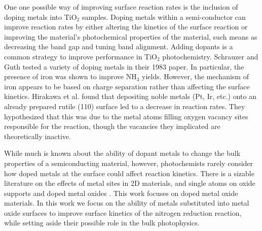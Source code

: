 One one possible way of improving surface reaction rates is the inclusion of doping metals into TiO$_2$ samples. Doping metals within a semi-conductor can improve reaction rates by either altering the kinetics of the surface reaction or improving the material's photochemical properties of the material, such means as decreasing the band gap and tuning band alignment. Adding dopants is a common strategy to improve performance in TiO$_2$ photochemistry.\cite{Schneider_2014, Li_2007, Dozzi_2013} Schrauzer and Guth tested a variety of doping metals in their 1983 paper.\cite{Schrauzer_1983} In particular, the presence of iron was shown to improve NH$_3$ yields\cite{Schrauzer_1977,Augugliaro_1982}. However, the mechanism of iron appears to be based on charge separation rather than affecting the surface kinetics.\cite{Comer_2018} Hirakawa et al. found that depositing noble metals (Pt, Ir, etc.) onto an already prepared rutile (110) surface led to a decrease in reaction rates.\cite{Hirakawa_2017} They hypothesized that this was due to the metal atoms filling oxygen vacancy sites responsible for the reaction, though the vacancies they implicated are theoretically inactive.\cite{Comer_2018} 

While much is known about the ability of dopant metals to change the bulk properties of a semiconducting material, however, photochemists rarely consider how doped metals at the surface could affect reaction kinetics. There is a sizable literature on the effects of metal sites in 2D materials\cite{Khan_2018}, and single atoms on oxide supports\cite{Liu_2016} and doped metal oxides \cite{Gu_2014, Ammal_2016 Gu_2017,Comer_2018, Garc_a_Mota_2011, Yao_2017}. This work focuses on doped metal oxide materials. In this work we focus on the ability of metals substituted into metal oxide surfaces to improve surface kinetics of the nitrogen reduction reaction, while setting aside their possible role in the bulk photophysics.



